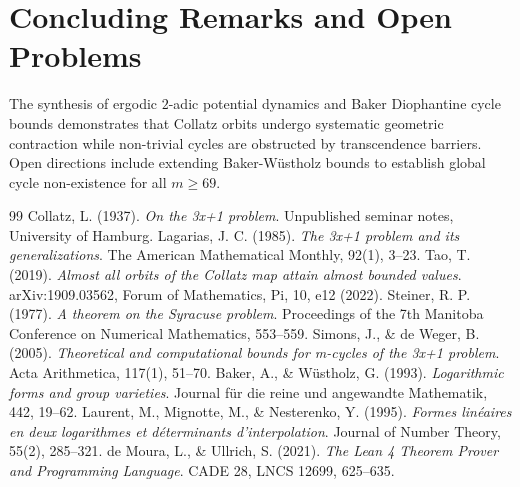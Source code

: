 \documentclass[11pt,a4paper]{article}
\theoremstyle{definition}
\begin{document}
\section{Concluding Remarks and Open Problems}
The synthesis of ergodic $2$-adic potential dynamics and Baker Diophantine cycle bounds demonstrates that Collatz orbits undergo systematic geometric contraction while non-trivial cycles are obstructed by transcendence barriers. Open directions include extending Baker-Wüstholz bounds to establish global cycle non-existence for all $m \ge 69$.

\begin{thebibliography}{99}
 Collatz, L. (1937). \textit{On the 3x+1 problem}. Unpublished seminar notes, University of Hamburg.
 Lagarias, J. C. (1985). \textit{The 3x+1 problem and its generalizations}. The American Mathematical Monthly, 92(1), 3--23.
 Tao, T. (2019). \textit{Almost all orbits of the Collatz map attain almost bounded values}. arXiv:1909.03562, Forum of Mathematics, Pi, 10, e12 (2022).
 Steiner, R. P. (1977). \textit{A theorem on the Syracuse problem}. Proceedings of the 7th Manitoba Conference on Numerical Mathematics, 553--559.
 Simons, J., \& de Weger, B. (2005). \textit{Theoretical and computational bounds for m-cycles of the 3x+1 problem}. Acta Arithmetica, 117(1), 51--70.
 Baker, A., \& Wüstholz, G. (1993). \textit{Logarithmic forms and group varieties}. Journal für die reine und angewandte Mathematik, 442, 19--62.
 Laurent, M., Mignotte, M., \& Nesterenko, Y. (1995). \textit{Formes linéaires en deux logarithmes et déterminants d'interpolation}. Journal of Number Theory, 55(2), 285--321.
 de Moura, L., \& Ullrich, S. (2021). \textit{The Lean 4 Theorem Prover and Programming Language}. CADE 28, LNCS 12699, 625--635.
\end{thebibliography}
\end{document}
